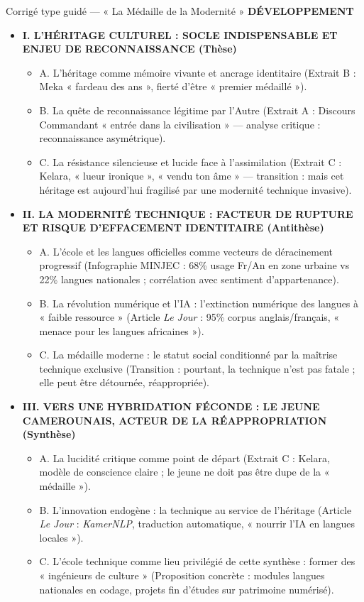 \documentclass[11pt]{article}
\begin{document}
\begin{exoresolu}{Corrigé type guidé — « La Médaille de la Modernité »}
\textbf{DÉVELOPPEMENT}
\begin{itemize}
    \item \textbf{I. L'HÉRITAGE CULTUREL : SOCLE INDISPENSABLE ET ENJEU DE RECONNAISSANCE (Thèse)}
    \begin{itemize}
        \item A. L'héritage comme mémoire vivante et ancrage identitaire (Extrait B : Meka « fardeau des ans », fierté d'être « premier médaillé »).
        \item B. La quête de reconnaissance légitime par l'Autre (Extrait A : Discours Commandant « entrée dans la civilisation » — analyse critique : reconnaissance asymétrique).
        \item C. La résistance silencieuse et lucide face à l'assimilation (Extrait C : Kelara, « lueur ironique », « vendu ton âme » — transition : mais cet héritage est aujourd'hui fragilisé par une modernité technique invasive).
    \end{itemize}
    \item \textbf{II. LA MODERNITÉ TECHNIQUE : FACTEUR DE RUPTURE ET RISQUE D'EFFACEMENT IDENTITAIRE (Antithèse)}
    \begin{itemize}
        \item A. L'école et les langues officielles comme vecteurs de déracinement progressif (Infographie MINJEC : 68\% usage Fr/An en zone urbaine vs 22\% langues nationales ; corrélation avec sentiment d'appartenance).
        \item B. La révolution numérique et l'IA : l'extinction numérique des langues à « faible ressource » (Article \emph{Le Jour} : 95\% corpus anglais/français, « menace pour les langues africaines »).
        \item C. La médaille moderne : le statut social conditionné par la maîtrise technique exclusive (Transition : pourtant, la technique n'est pas fatale ; elle peut être détournée, réappropriée).
    \end{itemize}
    \item \textbf{III. VERS UNE HYBRIDATION FÉCONDE : LE JEUNE CAMEROUNAIS, ACTEUR DE LA RÉAPPROPRIATION (Synthèse)}
    \begin{itemize}
        \item A. La lucidité critique comme point de départ (Extrait C : Kelara, modèle de conscience claire ; le jeune ne doit pas être dupe de la « médaille »).
        \item B. L'innovation endogène : la technique au service de l'héritage (Article \emph{Le Jour} : \emph{KamerNLP}, traduction automatique, « nourrir l'IA en langues locales »).
        \item C. L'école technique comme lieu privilégié de cette synthèse : former des « ingénieurs de culture » (Proposition concrète : modules langues nationales en codage, projets fin d'études sur patrimoine numérisé).
    \end{itemize}
\end{itemize}


\end{exoresolu}
\end{document}
